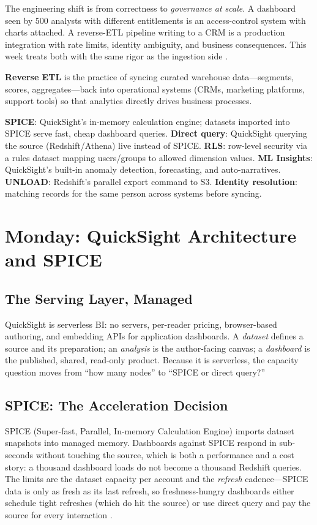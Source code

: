 The engineering shift is from correctness to \emph{governance at scale}. A dashboard seen by 500 analysts with different entitlements is an access-control system with charts attached. A reverse-ETL pipeline writing to a CRM is a production integration with rate limits, identity ambiguity, and business consequences. This week treats both with the same rigor as the ingestion side \cite{awsQuickSightDocs}.

\begin{definitionbox}
\textbf{Reverse ETL} is the practice of syncing curated warehouse data---segments, scores, aggregates---back into operational systems (CRMs, marketing platforms, support tools) so that analytics directly drives business processes.
\end{definitionbox}

\begin{keyterms}
\textbf{SPICE}: QuickSight's in-memory calculation engine; datasets imported into SPICE serve fast, cheap dashboard queries. \textbf{Direct query}: QuickSight querying the source (Redshift/Athena) live instead of SPICE. \textbf{RLS}: row-level security via a rules dataset mapping users/groups to allowed dimension values. \textbf{ML Insights}: QuickSight's built-in anomaly detection, forecasting, and auto-narratives. \textbf{UNLOAD}: Redshift's parallel export command to S3. \textbf{Identity resolution}: matching records for the same person across systems before syncing.
\end{keyterms}

\section{Monday: QuickSight Architecture and SPICE}
\subsection{The Serving Layer, Managed}
QuickSight is serverless BI: no servers, per-reader pricing, browser-based authoring, and embedding APIs for application dashboards. A \emph{dataset} defines a source and its preparation; an \emph{analysis} is the author-facing canvas; a \emph{dashboard} is the published, shared, read-only product. Because it is serverless, the capacity question moves from ``how many nodes'' to ``SPICE or direct query?''

\subsection{SPICE: The Acceleration Decision}
SPICE (Super-fast, Parallel, In-memory Calculation Engine) imports dataset snapshots into managed memory. Dashboards against SPICE respond in sub-seconds without touching the source, which is both a performance and a cost story: a thousand dashboard loads do not become a thousand Redshift queries. The limits are the dataset capacity per account and the \emph{refresh} cadence---SPICE data is only as fresh as its last refresh, so freshness-hungry dashboards either schedule tight refreshes (which do hit the source) or use direct query and pay the source for every interaction \cite{awsQuickSightDocs}.

